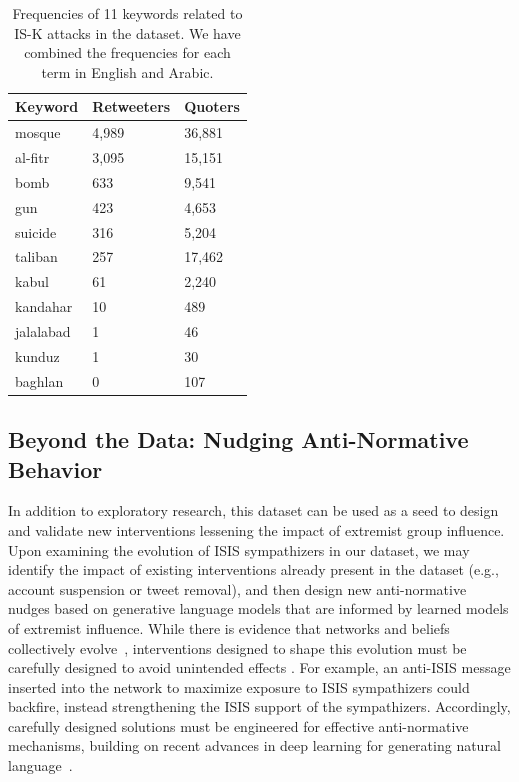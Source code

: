 \documentclass[letterpaper]{article}
\begin{document}
\begin{table}[!htbp]
\centering
\begin{adjustbox}{width=0.5\columnwidth}
\begin{tabular}{|l||l|l|}
 \hline
 Keyword & Retweeters & Quoters\\ [0.5ex]
 \hline\hline
 mosque & 4,989 & 36,881\\\hline
 al-fitr & 3,095 & 15,151\\\hline
  bomb & 633 & 9,541\\\hline
  gun & 423 & 4,653\\\hline
  suicide & 316 & 5,204\\\hline
  taliban & 257 & 17,462\\\hline
  kabul & 61 & 2,240\\\hline
  kandahar & 10 & 489\\\hline
  jalalabad & 1 & 46\\\hline
  kunduz & 1 & 30\\\hline
  baghlan & 0 & 107\\[0.25ex]\hline
\end{tabular}
\end{adjustbox}
\caption{Frequencies of 11 keywords related to IS-K attacks in the dataset. We have combined the frequencies for each term in English and Arabic.}
\label{table:attacks}
\end{table}



 \subsection{Beyond the Data: Nudging Anti-Normative Behavior}
In addition to exploratory research, this dataset can be used as a seed  to design and validate new interventions lessening the impact of extremist group influence. Upon  examining the evolution of ISIS sympathizers in our dataset,  we may  identify the impact of existing interventions already present in the dataset (e.g., account suspension or tweet removal), and then design new anti-normative nudges based on generative language models that are informed by learned models of extremist influence.
While there is evidence that networks and beliefs collectively evolve~\cite{lazer2010coevolution}, interventions designed to shape this evolution must be carefully designed to avoid unintended effects  \cite{Bail9216,nyhan2010corrections}.  For example, an anti-ISIS message  inserted into the network to maximize exposure to ISIS sympathizers could backfire, instead strengthening the ISIS support of the sympathizers. Accordingly, carefully designed solutions must be engineered for effective  anti-normative mechanisms, building on recent advances in deep learning for generating natural language~\cite{DBLP:journals/corr/BowmanVVDJB15,DBLP:journals/corr/abs-1708-02709}.
\end{document}
